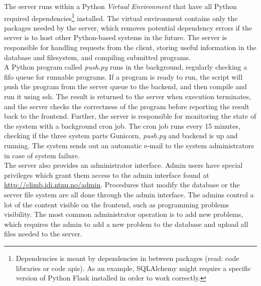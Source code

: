 The server runs within a Python \textit{Virtual Environment} \cite{VIRTUALENV} that have all Python required dependencies\footnote{Dependencies is meant by dependencies in between packages (read: code libraries or code \gls{api}s). As an example, SQLAlchemy might require a specific version of Python Flask installed in order to work correctly.} installed. The virtual environment contains only the packages needed by the server, which removes potential dependency errors if the server is to host other Python-based systems in the future. The server is responsible for handling requests from the client, storing useful information in the database and filesystem, and compiling submitted programs. \\

A Python program called \textit{push.py} runs in the background, regularly checking a \gls{fifo} queue for runnable programs. If a program is ready to run, the script will push the program from the server queue to the backend, and then compile and run it using \gls{ssh}. The result is returned to the server when execution terminates, and the server checks the correctness of the program before reporting the result back to the frontend. Further, the server is responsible for monitoring the state of the system with a background cron job. The cron job runs every 15 minutes, checking if the three system parts Gunicorn, \textit{push.py} and backend is up and running. The system sends out an automatic e-mail to the system administrators in case of system failure. \\

The server also provides an administrator interface. Admin users have special privileges which grant them access to the admin interface found at \url{http://climb.idi.ntnu.no/admin}. Procedures that modify the database or the server file system are all done through the admin interface. The admins control a lot of the content visible on the frontend, such as programming problems visibility. The most common administrator operation is to add new problems, which requires the admin to add a new problem to the database and upload all files needed to the server. \\

